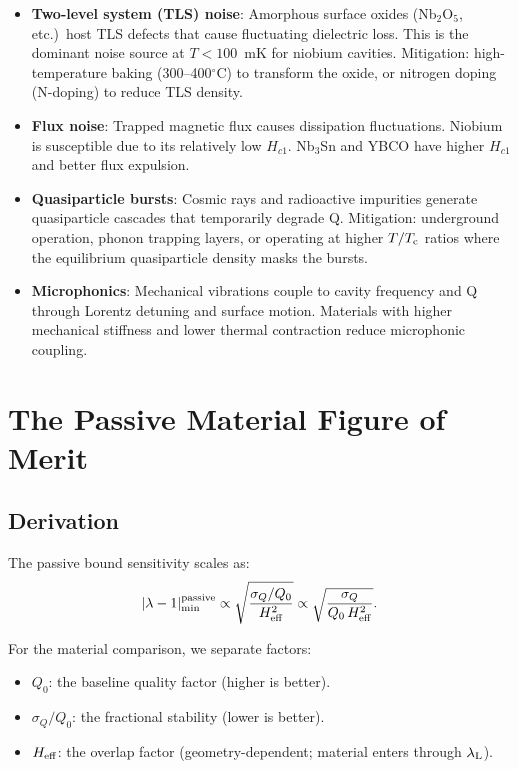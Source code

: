 \documentclass[11pt]{article}
\theoremstyle{definition}
\theoremstyle{remark}
\newcommand{\Tc}{T_{\rm c}}
\newcommand{\lambdaL}{\lambda_{\rm L}}
\newcommand{\lam}{|\lambda-1|}
\newcommand{\Heff}{H_{\rm eff}}
\begin{document}
\begin{itemize}[nosep]
  \item \textbf{Two-level system (TLS) noise}: Amorphous surface oxides
    (Nb$_2$O$_5$, etc.)\ host TLS defects that cause fluctuating
    dielectric loss. This is the dominant noise source at $T < 100$~mK
    for niobium cavities. Mitigation: high-temperature baking (300--400$^\circ$C)
    to transform the oxide, or nitrogen doping (N-doping) to reduce
    TLS density.
  \item \textbf{Flux noise}: Trapped magnetic flux causes dissipation
    fluctuations. Niobium is susceptible due to its relatively low
    $H_{c1}$. Nb$_3$Sn and YBCO have higher $H_{c1}$ and better flux
    expulsion.
  \item \textbf{Quasiparticle bursts}: Cosmic rays and radioactive
    impurities generate quasiparticle cascades that temporarily degrade
    Q. Mitigation: underground operation, phonon trapping layers, or
    operating at higher $T/\Tc$ ratios where the equilibrium quasiparticle
    density masks the bursts.
  \item \textbf{Microphonics}: Mechanical vibrations couple to cavity
    frequency and Q through Lorentz detuning and surface motion.
    Materials with higher mechanical stiffness and lower thermal
    contraction reduce microphonic coupling.
\end{itemize}


\section{The Passive Material Figure of Merit}
\label{sec:passive_fom}

\subsection{Derivation}

The passive bound sensitivity scales as:
\begin{equation}
  \lam_{\rm min}^{\rm passive} \propto
  \sqrt{\frac{\sigma_Q/Q_0}{\Heff^2}}
  \propto \sqrt{\frac{\sigma_Q}{Q_0\,\Heff^2}}.
  \label{eq:passive_sensitivity}
\end{equation}

For the material comparison, we separate factors:

\begin{itemize}[nosep]
  \item $Q_0$: the baseline quality factor (higher is better).
  \item $\sigma_Q/Q_0$: the fractional stability (lower is better).
  \item $\Heff$: the overlap factor (geometry-dependent; material enters
    through $\lambdaL$).
\end{itemize}
\end{document}
